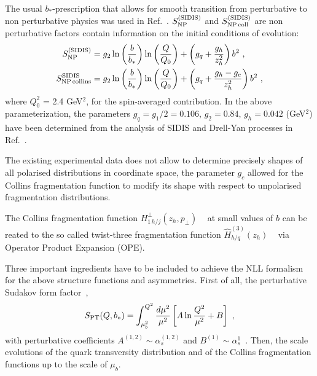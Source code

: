 \documentclass[twocolumn,showpacs,preprintnumbers,amsmath,amssymb,floatfix,prd]{revtex4}
\begin{document}
%
The usual $b_*$-prescription that allows for smooth transition from perturbative to non perturbative physics was used in Ref.~\cite{Kang:2015msa}. $S_{\rm NP}^{\rm (SIDIS)}$ and $S_{\rm NP\, coll}^{\rm (SIDIS)}$ are non perturbative factors contain information on the initial conditions of evolution:
\begin{align}
S_{\rm NP}^{\rm (SIDIS)} &= g_2 \ln\left(\frac{b}{b_*}\right)\ln\left(\frac{Q}{Q_0}\right)+\left({g_q}+\frac{g_h}{z_h^2}\right)b^2 \ , \\
S_{\rm NP\, collins}^{\rm SIDIS} &=g_2 \ln\left(\frac{b}{b_*}\right)\ln\left(\frac{Q}{Q_0}\right)+\left({g_q}+\frac{g_h-g_c}{z_h^2}\right)b^2 \ ,
\label{eq:sud_np}
\end{align}
where  $Q_0^2$ = 2.4 GeV$^2$, for the spin-averaged   contribution.
In the above parameterization, the parameters $g_q = g_1/2=0.106$, $g_2=0.84$, $g_h=0.042$  (GeV$^2$) have been determined
from the analysis of SIDIS and Drell-Yan processes in Ref.~\cite{Su:2014wpa}.  

The existing experimental data does not allow to determine precisely shapes of all polarised distributions in
 coordinate space,  the parameter $g_c$ allowed for the Collins fragmentation function to modify
 its shape with respect to unpolarised fragmentation distributions. 


The Collins fragmentation function $H_{1\, h/j}^\perp(z_h,p_\perp)$ ~\cite{Collins:1992kk} at small values of $b$ can be reated to the so called twist-three fragmentation function $\hat{H}_{h/q}^{(3)}(z_h)$ ~\cite{Yuan:2009dw} via Operator Product Expansion (OPE).

Three important ingredients have to be included to achieve the NLL
formalism for the above structure functions and asymmetries.
First of all, the perturbative Sudakov form factor~\cite{Koike:2006fn},
\begin{equation}
S_{\rm PT}(Q,b_*)=\int_{\mu_b^2}^{Q^2}\frac{d\mu^2}{\mu^2}\left[A\ln\frac{Q^2}{\mu^2}+B\right] \ ,\label{eq:spert}
\end{equation}
with perturbative coefficients $A^{(1,2)}\sim{\alpha_s^{(1,2)}}$ and $B^{(1)}\sim{\alpha_s^1}$~\cite{Nadolsky:1999kb,Koike:2006fn}.
Then, the scale evolutions of the quark trans\-ver\-si\-ty distribution and of the Collins fragmentation functions up to the scale of $\mu_b$.
\end{document}
